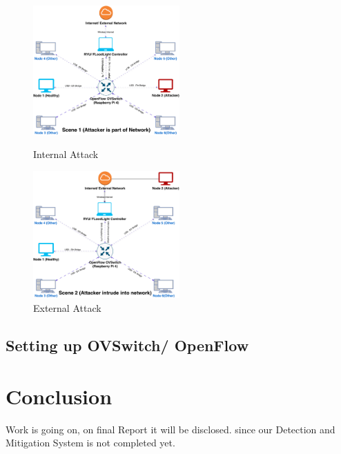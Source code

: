 \documentclass[12pt,twocolumn]{article}
\begin{document}
\begin{figure}[ht]
    \includegraphics[width=0.5\textwidth]{images/Scene1.pdf}
    \caption{Internal Attack}
    \label{fig:Scene1}
\vspace*{0.5 cm}
    \includegraphics[width=0.5\textwidth]{images/Scene2.pdf}
    \caption{External Attack}
    \label{fig:scene2}
\end{figure}

\subsection{Setting up OVSwitch/ OpenFlow}



\section{Conclusion}
Work is going on, on final Report it will be disclosed.
since our Detection and Mitigation System is not completed yet.




\twocolumn[
    \printbibliography
]
\end{document}

